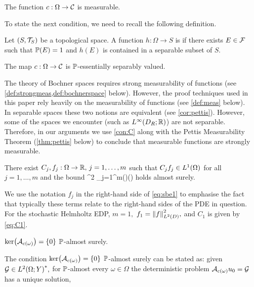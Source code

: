 \label{con:cborel}
 The function $c:\Omega \rightarrow \mathcal C$ is measurable.
\econvar

To state the next condition, we need to recall the following definition.

\label{def:sepval}
Let $\mleft(S,\Top{S}\mright)$ be a topological space. A function $h:\Omega\rightarrow S$ is  if there exists $E \in \mathcal F$ such that $\mathbb P(E) = 1$ and $h(E)$ is contained in a separable subset of $S$.
\ede


\label{con:C}
The map $c:\Omega\rightarrow\mathcal C$  is $\mathbb P$-essentially separably valued.
\econvar

The theory of Bochner spaces requires strong measurability of functions (see \cref{def:strongmeas,def:bochnerspace} below). However, the proof techniques used in this paper rely heavily on the measurability of functions (see \cref{def:meas} below). In separable spaces these two notions are equivalent (see \cref{cor:pettis}). However, some of the spaces we encounter (such as $\LiDRRR$) are not separable. Therefore, in our arguments we use \cref{con:C} along with the Pettis Measurability Theorem (\cref{thm:pettis} below) to conclude that measurable functions are strongly measurable.
\ere

\label{con:B}
There exist $C_{j},f_{j}:\Omega\rightarrow \mathbb R, \,j=1,\ldots,m$ such that $\Cj\fj \in \LoO$ for all $j=1,\ldots,m$ and the bound
\beq \label{eq:sbe1}
^2 \leq \sum_{j=1}^m\Cj(\omega)\fj(\omega)
\eeq
holds almost surely.
\econvar

We use the notation $f_j$ in the right-hand side of \eqref{eq:sbe1} to emphasise the fact that typically these terms relate to the right-hand sides of the PDE in question. For the stochastic Helmholtz EDP, $m=1,$ $f_1 = \NLtD{f}^2,$ and $C_1$ is given by \eqref{eq:C1}.
\ere


\label{con:K}
$\ker\mleft(\Acomega\mright) = \set{0}$ $\mathbb P$-almost surely.
\econvar

The condition  $\ker\mleft(\Acomega\mright) = \set{0}$ $\mathbb P$-almost surely can be stated as: given $\cG \in \LtOYas,$ for $\mathbb P$-almost every $\omega \in \Omega$ the deterministic problem $\Acomega \uz = \cG$ has a unique solution,

